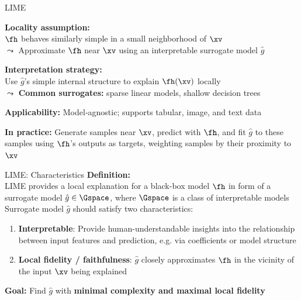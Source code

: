 \documentclass[10pt,compress,t,notes=noshow, xcolor=table]{beamer}
\newcommand{\gh}{\hat{g}}
\begin{document}







\begin{framei}[align=top]{LIME}
\item \textbf{Locality assumption:}\\
$\fh$ behaves similarly simple in a small neighborhood of $\xv$\\
$\leadsto$ Approximate $\fh$ near $\xv$ using an interpretable surrogate model $\gh$
\item \textbf{Interpretation strategy:}\\
Use $\gh$'s simple internal structure to explain $\fh(\xv)$ locally\\
$\leadsto$ \textbf{Common surrogates:} sparse linear models, shallow decision trees
\item \textbf{Applicability:} Model‑agnostic; supports tabular, image, and text data %
\item \textbf{In practice:}
Generate samples near $\xv$, predict with $\fh$, and fit $\gh$ to these samples using $\fh$'s outputs as targets, weighting samples by their proximity to $\xv$
\end{framei}


\begin{framev}[align=top]{LIME: Characteristics}
\textbf{Definition:}\\
LIME provides a local explanation for a black-box model $\fh$ in form of a surrogate model $\gh \in \Gspace$, where $\Gspace$ is a class of interpretable models\\
\spacer[0.25]
Surrogate model $\gh$ should satisfy two characteristics:
\begin{enumerate}
\item \textbf{Interpretable}: Provide human-understandable insights into the relationship between input features and prediction, e.g. via coefficients or model structure
\item \textbf{Local fidelity / faithfulness}: $\gh$ closely approximates $\fh$ in the vicinity of the input $\xv$ being explained
\end{enumerate}
\textbf{Goal:} Find $\gh$ with \textbf{minimal complexity and maximal local fidelity}
\end{framev}
\end{document}
